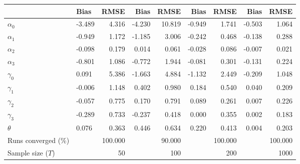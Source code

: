 
\begin{tabular}[t]{llrrrrrrr}
\toprule
  & Bias & RMSE & Bias & RMSE & Bias & RMSE & Bias & RMSE\\
\midrule
$\alpha_{0}$ & -3.489 & 4.316 & -4.230 & 10.819 & -0.949 & 1.741 & -0.503 & 1.064\\
$\alpha_{1}$ & -0.949 & 1.172 & -1.185 & 3.006 & -0.242 & 0.468 & -0.138 & 0.288\\
$\alpha_{2}$ & -0.098 & 0.179 & 0.014 & 0.061 & -0.028 & 0.086 & -0.007 & 0.021\\
$\alpha_{3}$ & -0.801 & 1.086 & -0.772 & 1.944 & -0.081 & 0.301 & -0.131 & 0.224\\
$\gamma_{0}$ & 0.091 & 5.386 & -1.663 & 4.884 & -1.132 & 2.449 & -0.209 & 1.048\\
$\gamma_{1}$ & -0.006 & 1.148 & 0.402 & 0.980 & 0.184 & 0.540 & 0.040 & 0.209\\
$\gamma_{2}$ & -0.057 & 0.775 & 0.170 & 0.791 & 0.089 & 0.261 & 0.007 & 0.226\\
$\gamma_{3}$ & -0.289 & 0.733 & -0.237 & 0.418 & 0.000 & 0.355 & 0.002 & 0.183\\
$\theta$ & 0.076 & 0.363 & 0.446 & 0.634 & 0.220 & 0.413 & 0.004 & 0.203\\
Runs converged (\%) &  & 100.000 &  & 90.000 &  & 100.000 &  & 100.000\\
Sample size ($T$) &  & 50 &  & 100 &  & 200 &  & 1000\\
\bottomrule
\end{tabular}
